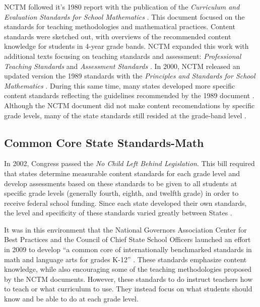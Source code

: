 \documentclass[
]{book}
\theoremstyle{definition}
\theoremstyle{definition}
\theoremstyle{definition}
\theoremstyle{definition}
\theoremstyle{remark}
\begin{document}
NCTM followed it's 1980 report with the publication of the \emph{Curriculum and Evaluation Standards for School Mathematics} \citep{NCTM1989}. This document focused on the standards for teaching methodologies and mathematical practices. Content standards were sketched out, with overviews of the recommended content knowledge for students in 4-year grade bands. NCTM expanded this work with additional texts focusing on teaching standards and assessment: \emph{Professional Teaching Standards} \citeyearpar{NCTM1991} and \emph{Assessment Standards} \citeyearpar{NCTM1995}. In 2000, NCTM released an updated version the 1989 standards with the \emph{Principles and Standards for School Mathematics} \citep{PSSM}. During this same time, many states developed more specific content standards reflecting the guidelines recommended by the 1989 document \citep{Raimi1998}. Although the NCTM document did not make content recomendations by specific grade levels, many of the state standards still resided at the grade-band level \citep[p.~677]{Reys2007}.

\hypertarget{common-core-state-standards-math}{%
\subsection{Common Core State Standards-Math}\label{common-core-state-standards-math}}

In 2002, Congress passed the \emph{No Child Left Behind Legislation}. This bill required that states determine measurable content standards for each grade level and develop assessments based on these standards to be given to all students at specific grade levels (generally fourth, eighth, and twelfth grade) in order to receive federal school funding. Since each state developed their own standards, the level and specificity of these standards varied greatly between States \citep{Reys2007}.

It was in this environment that the National Governors Association Center for Best Practices and the Council of Chief State School Officers launched an effort in 2009 to develop ``a common core of internationally benchmarked standards in math and language arts for grades K-12'' \citep{CCSS}. These standards emphasize content knowledge, while also encouraging some of the teaching methodologies proposed by the NCTM documents. However, these standards to do instruct teachers how to teach or what curriculum to use. They instead focus on what students should know and be able to do at each grade level.
\end{document}
